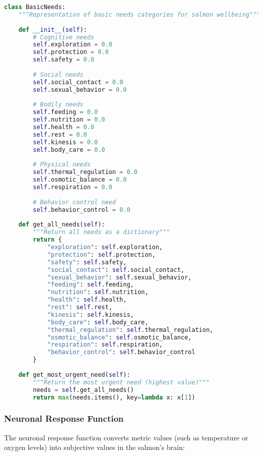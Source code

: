 \documentclass[11pt,a4paper]{article}
\begin{document}
\begin{lstlisting}[language=Python]
class BasicNeeds:
    """Representation of basic needs categories for salmon wellbeing"""
    
    def __init__(self):
        # Cognitive needs
        self.exploration = 0.0
        self.protection = 0.0
        self.safety = 0.0
        
        # Social needs
        self.social_contact = 0.0
        self.sexual_behavior = 0.0
        
        # Bodily needs
        self.feeding = 0.0
        self.nutrition = 0.0
        self.health = 0.0
        self.rest = 0.0
        self.kinesis = 0.0
        self.body_care = 0.0
        
        # Physical needs
        self.thermal_regulation = 0.0
        self.osmotic_balance = 0.0
        self.respiration = 0.0
        
        # Behavior control need
        self.behavior_control = 0.0
        
    def get_all_needs(self):
        """Return all needs as a dictionary"""
        return {
            "exploration": self.exploration,
            "protection": self.protection,
            "safety": self.safety,
            "social_contact": self.social_contact,
            "sexual_behavior": self.sexual_behavior,
            "feeding": self.feeding,
            "nutrition": self.nutrition,
            "health": self.health,
            "rest": self.rest,
            "kinesis": self.kinesis,
            "body_care": self.body_care,
            "thermal_regulation": self.thermal_regulation,
            "osmotic_balance": self.osmotic_balance,
            "respiration": self.respiration,
            "behavior_control": self.behavior_control
        }
        
    def get_most_urgent_need(self):
        """Return the most urgent need (highest value)"""
        needs = self.get_all_needs()
        return max(needs.items(), key=lambda x: x[1])
\end{lstlisting}

\subsubsection{Neuronal Response Function}
The neuronal response function converts metric values (such as temperature or oxygen levels) into subjective values in the salmon's brain:
\end{document}
